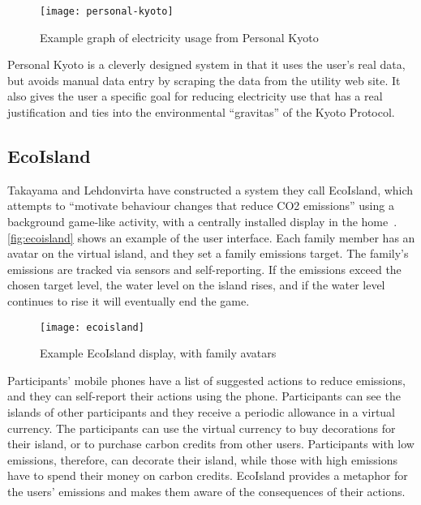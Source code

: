 \begin{figure}[htbp]
	\centering
		\texttt{[image: personal-kyoto]}
		\caption{Example graph of electricity usage from Personal Kyoto}
		\label{fig:personal-kyoto}
\end{figure}

Personal Kyoto is a cleverly designed system in that it uses the user's real data, but avoids manual data entry by scraping the data from the utility web site. It also gives the user a specific goal for reducing electricity use that has a real justification and ties into the environmental ``gravitas'' of the Kyoto Protocol.

\subsection{EcoIsland}
\label{sec:ecoisland}

Takayama and Lehdonvirta have constructed a system they call EcoIsland, which attempts to ``motivate behaviour changes that reduce CO2 emissions'' using a background game-like activity, with a centrally installed display in the home~\cite{takayama-2008}. \autoref{fig:ecoisland} shows an example of the user interface. Each family member has an avatar on the virtual island, and they set a family \COtwo emissions target. The family's emissions are tracked via sensors and self-reporting. If the emissions exceed the chosen target level, the water level on the island rises, and if the water level continues to rise it will eventually end the game.

\begin{figure}[htb]
	\centering
		\texttt{[image: ecoisland]}
		\caption{Example EcoIsland display, with family avatars}
		\label{fig:ecoisland}
\end{figure}

Participants' mobile phones have a list of suggested actions to reduce emissions, and they can self-report their actions using the phone. Participants can see the islands of other participants and they receive a periodic allowance in a virtual currency. The participants can use the virtual currency to buy decorations for their island, or to purchase carbon credits from other users. Participants with low emissions, therefore, can decorate their island, while those with high emissions have to spend their money on carbon credits. EcoIsland provides a metaphor for the users' emissions and makes them aware of the consequences of their actions.

